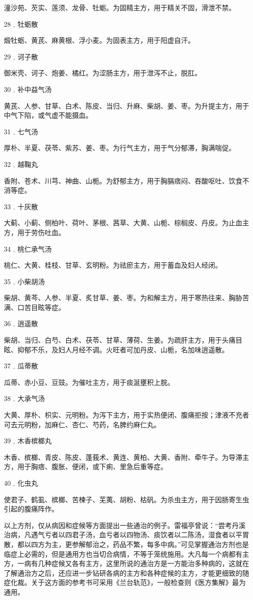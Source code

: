 \documentclass[12pt,UTF8]{ctexbook}
\begin{document}
潼沙苑、芡实、莲须、龙骨、牡蛎。为固精主方，用于精关不固，滑泄不禁。

28﹒牡蛎散

煅牡蛎、黄芪、麻黄根、浮小麦。为固表主方，用于阳虚自汗。

29﹒诃子散

御米壳、诃子、炮姜、橘红。为涩肠主方，用于泄泻不止，脱肛。

30﹒补中益气汤

黄芪、人参、甘草、白术、陈皮、当归、升麻、柴胡、姜、枣。为升提主方，用于中气下陷，或气虚不能摄血。

31﹒七气汤

厚朴、半夏、茯苓、紫苏、姜、枣。为行气主方，用于气分郁滞，胸满喘促。

32﹒越鞠丸

香附、苍术、川芎、神曲、山栀。为舒郁主方，用于胸膈痞闷、吞酸呕吐、饮食不消等症。

33﹒十灰散

大蓟、小蓟、侧柏叶、荷叶、茅根、茜草、大黄、山栀、棕榈皮、丹皮。为止血主方，用于劳伤吐血。

34﹒桃仁承气汤

桃仁、大黄、桂枝、甘草、玄明粉。为祛瘀主方，用于蓄血及妇人经闭。

35﹒小柴胡汤

柴胡、黄芩、人参、半夏、炙甘草、姜、枣。为和解主方，用于寒热往来、胸胁苦满、口苦目眩等症。

36﹒逍遥散

柴胡、当归、白芍、白术、茯苓、甘草、薄荷、生姜。为疏肝主方，用于头痛目眩、抑郁不乐，及妇人月经不调。火旺者可加丹皮、山栀，名加味逍遥散。

37﹒瓜蒂散

瓜蒂、赤小豆、豆豉。为催吐主方，用于痰涎壅积上脘。

38﹒大承气汤

大黄、厚朴、枳实、元明粉。为泻下主方，用于实热便闭、腹痛拒按；津液不充者可去元明粉，加麻仁、杏仁、芍药，名脾约麻仁丸。

39﹒木香槟榔丸

木香、槟榔、青皮、陈皮、蓬莪术、黄连、黄柏、大黄、香附、牵牛子。为导滞主方，用于胸痞、腹胀、便闭，或下痢、里急后重等症。

40﹒化虫丸

使君子、鹤虱、槟榔、苦楝子、芜荑、胡粉、枯矾。为杀虫主方，用于因肠寄生虫引起的腹痛阵作。

以上方剂，仅从病因和症候等方面提出一些通治的例子。雷福亭曾说：“尝考丹溪治病，凡遇气亏者以四君子汤，血亏者以四物汤、痰饮者以二陈汤，湿食者以平胃散，都以四方为主，更参解郁治之，药品不繁，每多中病。”可见掌握通治方剂也是临症上必需的，但是通用方也当切合病情，不等于笼统施用。大凡每一个病都有主方，一病有几种症候又各有主方，这里所说的通治方是一方能治多种病的，这就在了解通治方之后，还应进一步钻研各病的主方和各种症候的主方，才能更细致的随症化裁。关于这方面的参考书可采用《兰台轨范》，一般检查则《医方集解》最为通用。
\end{document}
